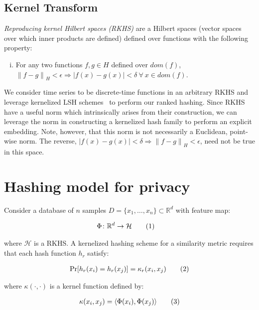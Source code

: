 \documentclass[a4paper]{article}
\newcommand\numberthis{\addtocounter{equation}{1}\tag{\theequation}}
\newcommand{\norm}[1]{\left\lVert#1\right\rVert}
\newcommand{\innerproduct}[2]{\langle{}#1,#2\rangle{}}
\begin{document}
\subsection{Kernel Transform}

\textit{Reproducing kernel Hilbert spaces (RKHS)} are a Hilbert spaces (vector spaces over which inner products are defined) defined over functions with the following property:
\begin{enumerate}[(i)]
    \item For any two functions $f,g \in H$ defined over $dom(f)$, $\norm{f-g}_{H} < \epsilon \Rightarrow |f(x)-g(x)| < \delta~\forall~x \in dom(f)$. 
\end{enumerate}

We consider time series to be discrete-time functions in an arbitrary RKHS and leverage kernelized LSH schemes~\cite{Kale14-KLSH,Jiang15-KLSH, Kulis12-KLSH} to perform our ranked hashing.
Since RKHS have a useful norm which intrinsically arises from their construction, we can leverage the norm in constructing a kernelized hash family to perform an explicit embedding.
Note, however, that this norm is not necessarily a Euclidean, point-wise norm.
The reverse, $|f(x)-g(x)| < \delta \Rightarrow \norm{f-g}_{H} < \epsilon$, need not be true in this space.

\fi{}

\section{Hashing model for privacy}

Consider a database of $n$ samples $D = \{x_1,\ldots,x_n\} \subset \mathbb{R}^d$ with feature map:

\begin{align*}
    \Phi \colon \mathbb{R}^d &\to \mathcal{H} \numberthis
\end{align*}

where $\mathcal{H}$ is a RKHS\@.
A kernelized hashing scheme for a similarity metric requires that each hash function $h_r$ satisfy:

\begin{align*}
    \Pr[h_r(x_i) = h_r(x_j)] = \kappa_r(x_i, x_j) \numberthis
    \label{eqn:hash_collision}
\end{align*}

where $\kappa(\cdot,\cdot)$ is a kernel function defined by:

\begin{align*}
    \kappa(x_i,x_j) = \innerproduct{\Phi(x_i)}{\Phi(x_j)} \numberthis
\end{align*}
\end{document}
